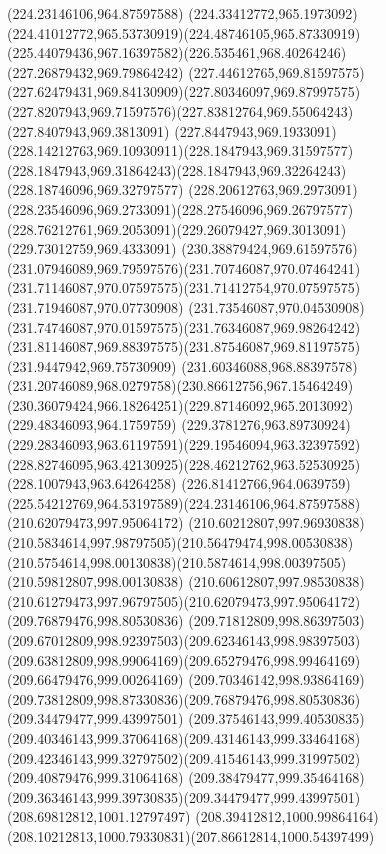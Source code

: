 {{	\moveto(224.23146106,964.87597588)
	\curveto(224.33412772,965.1973092)(224.41012772,965.53730919)(224.48746105,965.87330919)
	\curveto(225.44079436,967.16397582)(226.535461,968.40264246)(227.26879432,969.79864242)
	\curveto(227.44612765,969.81597575)(227.62479431,969.84130909)(227.80346097,969.87997575)
	\curveto(227.8207943,969.71597576)(227.83812764,969.55064243)(227.8407943,969.3813091)
	\curveto(227.8447943,969.1933091)(228.14212763,969.10930911)(228.1847943,969.31597577)
	\curveto(228.1847943,969.31864243)(228.1847943,969.32264243)(228.18746096,969.32797577)
	\curveto(228.20612763,969.2973091)(228.23546096,969.2733091)(228.27546096,969.26797577)
	\curveto(228.76212761,969.2053091)(229.26079427,969.3013091)(229.73012759,969.4333091)
	\curveto(230.38879424,969.61597576)(231.07946089,969.79597576)(231.70746087,970.07464241)
	\curveto(231.71146087,970.07597575)(231.71412754,970.07597575)(231.71946087,970.07730908)
	\curveto(231.73546087,970.04530908)(231.74746087,970.01597575)(231.76346087,969.98264242)
	\curveto(231.81146087,969.88397575)(231.87546087,969.81197575)(231.9447942,969.75730909)
	\curveto(231.60346088,968.88397578)(231.20746089,968.0279758)(230.86612756,967.15464249)
	\curveto(230.36079424,966.18264251)(229.87146092,965.2013092)(229.48346093,964.1759759)
	\curveto(229.3781276,963.89730924)(229.28346093,963.61197591)(229.19546094,963.32397592)
	\curveto(228.82746095,963.42130925)(228.46212762,963.52530925)(228.1007943,963.64264258)
	\curveto(226.81412766,964.0639759)(225.54212769,964.53197589)(224.23146106,964.87597588)
	\moveto(210.62079473,997.95064172)
	\curveto(210.60212807,997.96930838)(210.5834614,997.98797505)(210.56479474,998.00530838)
	\curveto(210.5754614,998.00130838)(210.5874614,998.00397505)(210.59812807,998.00130838)
	\curveto(210.60612807,997.98530838)(210.61279473,997.96797505)(210.62079473,997.95064172)
	\moveto(209.76879476,998.80530836)
	\curveto(209.71812809,998.86397503)(209.67012809,998.92397503)(209.62346143,998.98397503)
	\curveto(209.63812809,998.99064169)(209.65279476,998.99464169)(209.66479476,999.00264169)
	\curveto(209.70346142,998.93864169)(209.73812809,998.87330836)(209.76879476,998.80530836)
	\moveto(209.34479477,999.43997501)
	\curveto(209.37546143,999.40530835)(209.40346143,999.37064168)(209.43146143,999.33464168)
	\curveto(209.42346143,999.32797502)(209.41546143,999.31997502)(209.40879476,999.31064168)
	\curveto(209.38479477,999.35464168)(209.36346143,999.39730835)(209.34479477,999.43997501)
	\moveto(208.69812812,1001.12797497)
	\curveto(208.39412812,1000.99864164)(208.10212813,1000.79330831)(207.86612814,1000.54397499)
}}
